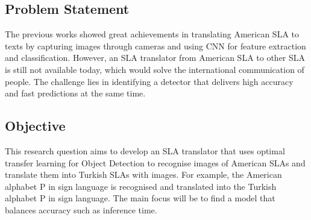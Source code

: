 \subsection{Problem Statement}
The previous works showed great achievements in translating American SLA to texts by capturing images through cameras and using CNN for feature extraction and classification. However, an SLA translator from American SLA to other SLA is still not available today, which would solve the international communication of people. The challenge lies in identifying a detector that delivers high accuracy and fast predictions at the same time.

\subsection{Objective}
This research question aims to develop an SLA translator that uses optimal transfer learning for Object Detection to recognise images of American SLAs and translate them into Turkish SLAs with images. For example, the American alphabet P in sign language is recognised and translated into the Turkish alphabet P in sign language. The main focus will be to find a model that balances accuracy such as inference time.